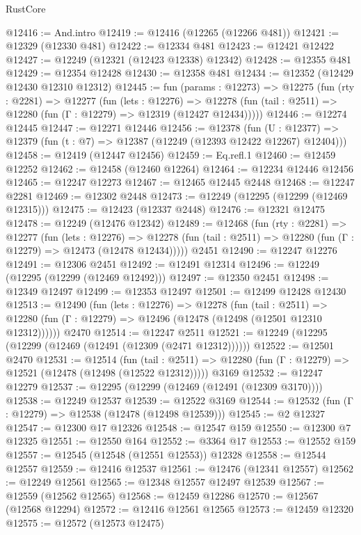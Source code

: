 \begin{lexlean}{RustCore}
\begin{coremodule}
@12416 := And.intro
@12419 := @12416 (@12265 (@12266 @481))
@12421 := @12329 (@12330 @481)
@12422 := @12334 @481
@12423 := @12421 @12422
@12427 := @12249 (@12321 (@12423 @12338) @12342)
@12428 := @12355 @481
@12429 := @12354 @12428
@12430 := @12358 @481
@12434 := @12352 (@12429 @12430 @12310 @12312)
@12445 := fun (params : @12273) =>
  @12275
    (fun (rty : @2281) =>
    @12277
      (fun (lets : @12276) =>
      @12278 (fun (tail : @2511) => @12280 (fun (Γ : @12279) => @12319 (@12427 @12434)))))
@12446 := @12274 @12445
@12447 := @12271 @12446
@12456 := @12378
    (fun (U : @12377) => @12379 (fun (t : @7) => @12387 (@12249 (@12393 @12422 @12267) @12404)))
@12458 := @12419 (@12447 @12456)
@12459 := Eq.refl.{1}
@12460 := @12459 @12252
@12462 := @12458 (@12460 @12264)
@12464 := @12234 @12446 @12456
@12465 := @12247 @12273
@12467 := @12465 @12445 @2448
@12468 := @12247 @2281
@12469 := @12302 @2448
@12473 := @12249 (@12295 (@12299 (@12469 @12315)))
@12475 := @12423 (@12337 @2448)
@12476 := @12321 @12475
@12478 := @12249 (@12476 @12342)
@12489 := @12468
    (fun (rty : @2281) =>
    @12277
      (fun (lets : @12276) =>
      @12278 (fun (tail : @2511) => @12280 (fun (Γ : @12279) => @12473 (@12478 @12434)))))
    @2451
@12490 := @12247 @12276
@12491 := @12306 @2451
@12492 := @12491 @12314
@12496 := @12249 (@12295 (@12299 (@12469 @12492)))
@12497 := @12350 @2451
@12498 := @12349 @12497
@12499 := @12353 @12497
@12501 := @12499 @12428 @12430
@12513 := @12490
    (fun (lets : @12276) =>
    @12278
      (fun (tail : @2511) =>
      @12280 (fun (Γ : @12279) => @12496 (@12478 (@12498 (@12501 @12310 @12312))))))
    @2470
@12514 := @12247 @2511
@12521 := @12249 (@12295 (@12299 (@12469 (@12491 (@12309 (@2471 @12312))))))
@12522 := @12501 @2470
@12531 := @12514
    (fun (tail : @2511) => @12280 (fun (Γ : @12279) => @12521 (@12478 (@12498 (@12522 @12312)))))
    @3169
@12532 := @12247 @12279
@12537 := @12295 (@12299 (@12469 (@12491 (@12309 @3170))))
@12538 := @12249 @12537
@12539 := @12522 @3169
@12544 := @12532 (fun (Γ : @12279) => @12538 (@12478 (@12498 @12539)))
@12545 := @2 @12327
@12547 := @12300 @17 @12326
@12548 := @12547 @159
@12550 := @12300 @7 @12325
@12551 := @12550 @164
@12552 := @3364 @17
@12553 := @12552 @159
@12557 := @12545 (@12548 (@12551 @12553)) @12328
@12558 := @12544 @12557
@12559 := @12416 @12537
@12561 := @12476 (@12341 @12557)
@12562 := @12249 @12561
@12565 := @12348 @12557 @12497 @12539
@12567 := @12559 (@12562 @12565)
@12568 := @12459 @12286
@12570 := @12567 (@12568 @12294)
@12572 := @12416 @12561 @12565
@12573 := @12459 @12320
@12575 := @12572 (@12573 @12475)

\end{coremodule}
\end{lexlean}
